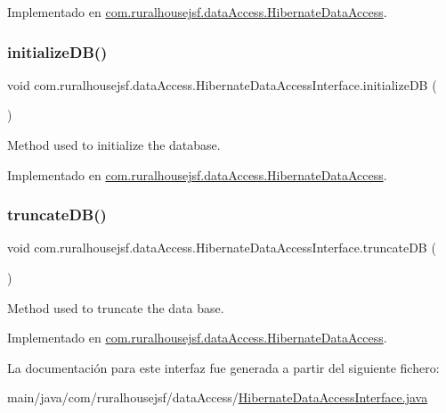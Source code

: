 Implementado en \mbox{\hyperlink{a00144_ad428053d12fae95599312c13951f9c87}{com.\+ruralhousejsf.\+data\+Access.\+Hibernate\+Data\+Access}}.

\mbox{\label{a00148_acab426a4933f3510c317816c136cec0b}} 
\subsubsection{\texorpdfstring{initializeDB()}{initializeDB()}}
{\footnotesize\ttfamily void com.\+ruralhousejsf.\+data\+Access.\+Hibernate\+Data\+Access\+Interface.\+initialize\+DB (\begin{DoxyParamCaption}{ }\end{DoxyParamCaption})}



Method used to initialize the database. 



Implementado en \mbox{\hyperlink{a00144_af6f8016d5e185e86519871913781fe73}{com.\+ruralhousejsf.\+data\+Access.\+Hibernate\+Data\+Access}}.

\mbox{\label{a00148_a181eb91e600e57fe36301128022f535d}} 
\subsubsection{\texorpdfstring{truncateDB()}{truncateDB()}}
{\footnotesize\ttfamily void com.\+ruralhousejsf.\+data\+Access.\+Hibernate\+Data\+Access\+Interface.\+truncate\+DB (\begin{DoxyParamCaption}{ }\end{DoxyParamCaption})}



Method used to truncate the data base. 



Implementado en \mbox{\hyperlink{a00144_a81a5e60db58acfc1a3c1de2f014813d5}{com.\+ruralhousejsf.\+data\+Access.\+Hibernate\+Data\+Access}}.



La documentación para este interfaz fue generada a partir del siguiente fichero\+:\begin{DoxyCompactItemize}
\item 
main/java/com/ruralhousejsf/data\+Access/\mbox{\hyperlink{a00017}{Hibernate\+Data\+Access\+Interface.\+java}}\end{DoxyCompactItemize}
